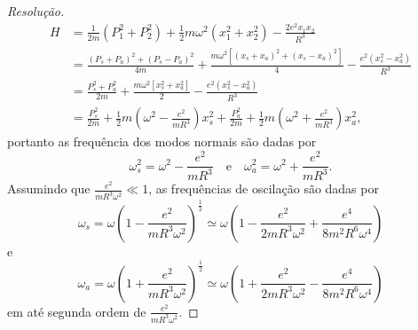 \begin{proof}[Resolução]
    \begin{align*}
        H &= \frac{1}{2m}(P_1^2 + P_2^2) + \frac12 m \omega^2(x_1^2 + x_2^2) - \frac{2e^2x_1x_2}{R^3}\\
          &= \frac{(P_s + P_a)^2 + (P_s - P_a)^2}{4m} + \frac{m \omega^2\left[(x_s + x_a)^2 + (x_s - x_a)^2\right]}4  -\frac{e^2(x_s^2 - x_a^2)}{R^3}\\
          &= \frac{P_s^2 + P_a^2}{2m} + \frac{m \omega^2\left[x_s^2 + x_a^2\right]}2  -\frac{e^2(x_s^2 - x_a^2)}{R^3}\\
          &= \frac{P_s^2}{2m} + \frac12m\left(\omega^2 - \frac{e^2}{mR^3}\right)x_s^2 + \frac{P_a^2}{2m} + \frac12 m\left(\omega^2 + \frac{e^2}{m R^3}\right)x_a^2,
    \end{align*}
    portanto as frequência dos modos normais são dadas por
    \begin{equation*}
        \omega_s^2 = \omega^2 - \frac{e^2}{mR^3}\quad\text{e}\quad\omega_a^2 = \omega^2 + \frac{e^2}{m R^3}.
    \end{equation*}
    Assumindo que \(\frac{e^2}{mR^3 \omega^2} \ll 1\), as frequências de oscilação são dadas por
    \begin{equation*}
        \omega_s = \omega \left(1 - \frac{e^2}{mR^3 \omega^2}\right)^{\frac12} \simeq \omega \left(1 - \frac{e^2}{2mR^3\omega^2} + \frac{e^4}{8m^2 R^6 \omega^4}\right)
    \end{equation*}
    e
    \begin{equation*}
        \omega_a = \omega \left(1 + \frac{e^2}{mR^3 \omega^2}\right)^{\frac12} \simeq \omega \left(1 + \frac{e^2}{2mR^3\omega^2} - \frac{e^4}{8m^2 R^6 \omega^4}\right)
    \end{equation*}
    em até segunda ordem de \(\frac{e^2}{mR^3 \omega^2}\).
\end{proof}

